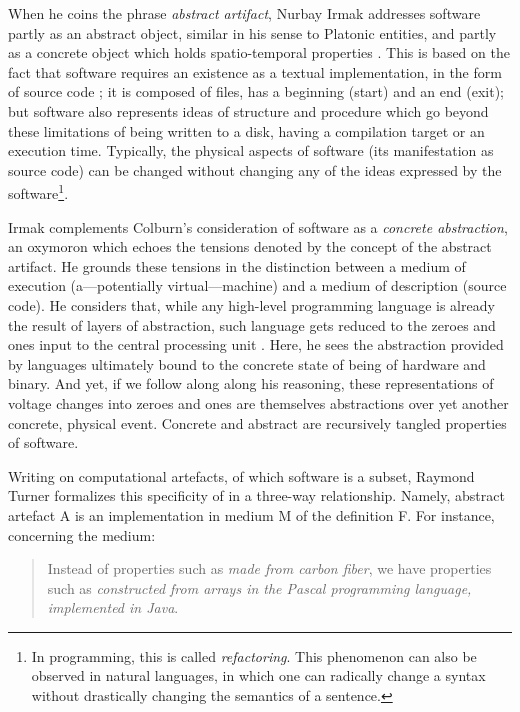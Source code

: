 When he coins the phrase \emph{abstract artifact}, Nurbay Irmak addresses software partly as an abstract object, similar in his sense to Platonic entities, and partly as a concrete object which holds spatio-temporal properties \citep{irmak_software_2012}. This is based on the fact that software requires an existence as a textual implementation, in the form of source code \citep{suber_what_1988}; it is composed of files, has a beginning (start) and an end (exit); but software also represents ideas of structure and procedure which go beyond these limitations of being written to a disk, having a compilation target or an execution time. Typically, the physical aspects of software (its manifestation as source code) can be changed without changing any of the ideas expressed by the software\footnote{In programming, this is called \emph{refactoring}. This phenomenon can also be observed in natural languages, in which one can radically change a syntax without drastically changing the semantics of a sentence.}.

Irmak complements Colburn's consideration of software as a \emph{concrete abstraction}, an oxymoron which echoes the tensions denoted by the concept of the abstract artifact. He grounds these tensions in the distinction between a medium of execution (a—potentially virtual—machine) and a medium of description (source code). He considers that, while any high-level programming language is already the result of layers of abstraction, such language gets reduced to the zeroes and ones input to the central processing unit \citep{colburn_philosophy_2000}. Here, he sees the abstraction provided by languages ultimately bound to the concrete state of being of hardware and binary. And yet, if we follow along along his reasoning, these representations of voltage changes into zeroes and ones are themselves abstractions over yet another concrete, physical event. Concrete and abstract are recursively tangled properties of software.

Writing on computational artefacts, of which software is a subset, Raymond Turner formalizes this specificity of in a three-way relationship. Namely, abstract artefact A is an implementation in medium M of the definition F. For instance, concerning the medium:

\begin{quote}
    Instead of properties such as \emph{made from carbon fiber}, we have properties such as \emph{constructed from arrays in the Pascal programming language, implemented in Java}. \citep{turner_computational_2018}
\end{quote}

